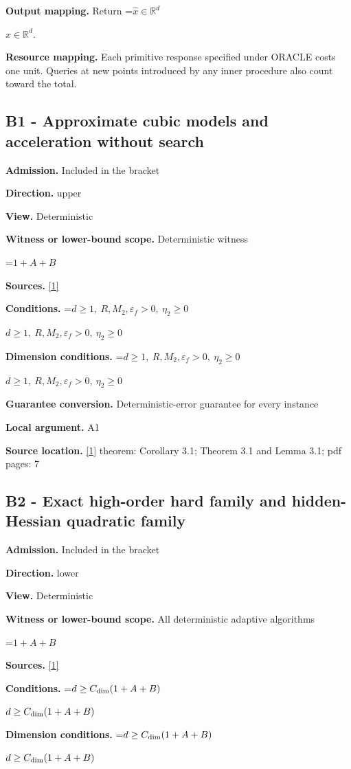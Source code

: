\documentclass[10pt,a4paper]{article}
\newcommand{\AtlasMath}[1]{\par\begingroup\centering\setbox0=\hbox{$\displaystyle #1$}\ifdim\wd0>1.4\linewidth\typeout{ATLAS WIDE FORMULA: \the\wd0}\fi\ifdim\wd0>\linewidth\resizebox{\linewidth}{!}{\box0}\else\box0\fi\par\endgroup}
\newcommand{\AtlasInlineMath}[1]{\begingroup\setbox0=\hbox{$#1$}\ifdim\wd0>.4\linewidth\endgroup\AtlasMath{#1}\else\endgroup$#1$\fi}
\begin{document}
\textbf{Output mapping.} Return \AtlasInlineMath{\widehat{x}\in \mathbb{R}^d}.

\textbf{Resource mapping.} Each primitive response specified under ORACLE costs one unit. Queries at new points introduced by any inner procedure also count toward the total.

\subsection{B1 - Approximate cubic models and acceleration without search}
\textbf{Admission.} Included in the bracket

\textbf{Direction.} upper

\textbf{View.} Deterministic

\textbf{Witness or lower-bound scope.} Deterministic witness

\AtlasMath{1+A+B}
\textbf{Sources.} \href{https://arxiv.org/abs/2607.24520v3}{[1]}

\textbf{Conditions.} \AtlasInlineMath{d\ge1,\ R,M_2,\varepsilon_f>0,\ \eta_2\ge0}

\textbf{Dimension conditions.} \AtlasInlineMath{d\ge1,\ R,M_2,\varepsilon_f>0,\ \eta_2\ge0}

\textbf{Guarantee conversion.} Deterministic-error guarantee for every instance

\textbf{Local argument.} A1

\textbf{Source location.} \href{https://arxiv.org/abs/2607.24520v3}{[1]} theorem: Corollary 3.1; Theorem 3.1 and Lemma 3.1; pdf pages: 7

\subsection{B2 - Exact high-order hard family and hidden-Hessian quadratic family}
\textbf{Admission.} Included in the bracket

\textbf{Direction.} lower

\textbf{View.} Deterministic

\textbf{Witness or lower-bound scope.} All deterministic adaptive algorithms

\AtlasMath{1+A+B}
\textbf{Sources.} \href{https://arxiv.org/abs/2607.24520v3}{[1]}

\textbf{Conditions.} \AtlasInlineMath{d\ge C_{\rm dim}(1+A+B)}

\textbf{Dimension conditions.} \AtlasInlineMath{d\ge C_{\rm dim}(1+A+B)}
\end{document}
